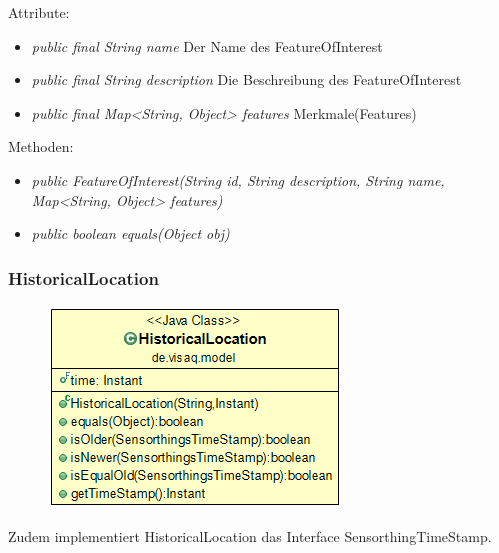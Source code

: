 Attribute:
\begin{itemize} 
	\item \emph{public final String name} Der Name des FeatureOfInterest
	\item \emph{public final String description} Die Beschreibung des FeatureOfInterest
	\item \emph{public final Map<String, Object> features} Merkmale(Features)
\end{itemize}
Methoden:
\begin{itemize} 
	\item \emph{public FeatureOfInterest(String id, String description, String name, Map<String, Object> features)} 
	\item \emph{public boolean equals(Object obj)} 
\end{itemize}


\subsubsection {HistoricalLocation}
\begin{minipage}{0.3\textwidth}
	\begin{figure}[H]
		\includegraphics[scale = 0.5
		]{media/frontend/model/HistoricalLocation_Class.png}
	\end{figure}
\end{minipage} \hfill
\begin{minipage}{0.6\textwidth}
	 Zudem implementiert HistoricalLocation das Interface SensorthingTimeStamp.
\end{minipage}

